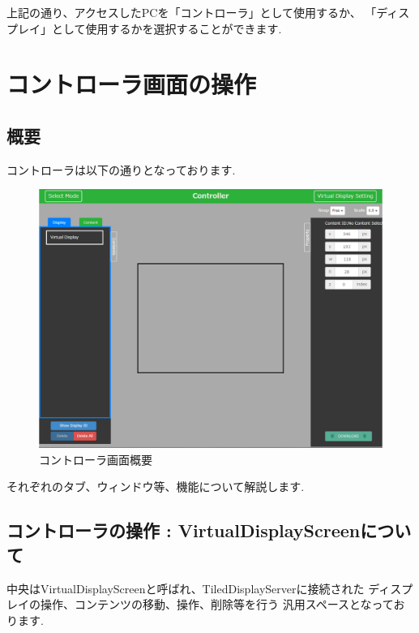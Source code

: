 \documentclass[a4paper,10pt,oneside]{jsbook}
\begin{document}
上記の通り、アクセスしたPCを「コントローラ」として使用するか、
「ディスプレイ」として使用するかを選択することができます.\\

\newpage


\chapter{コントローラ画面の操作}
\section{概要}
コントローラは以下の通りとなっております.\\
\begin{figure}[htbp]
	\begin{center}
		\includegraphics[width=15.5cm]{image/cont_1.PNG}
	\end{center}
	\caption{コントローラ画面概要}
	\label{fig:controller}
\end{figure}

それぞれのタブ、ウィンドウ等、機能について解説します.\\

\newpage


\section{コントローラの操作 : VirtualDisplayScreenについて}
中央はVirtualDisplayScreenと呼ばれ、TiledDisplayServerに接続された
ディスプレイの操作、コンテンツの移動、操作、削除等を行う
汎用スペースとなっております.\\
\end{document}
